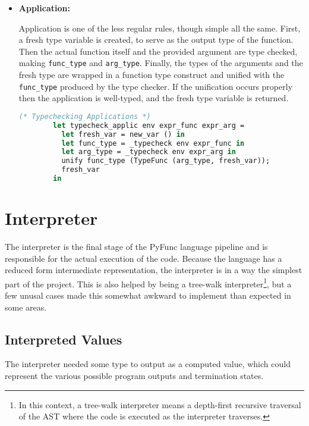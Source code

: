 \documentclass{l4proj}
\begin{document}
\begin{itemize}
    \item \textbf{Application:}
    
    Application is one of the less regular rules, though simple all the same.
    First, a fresh type variable is created, to serve as the output type of the function.
    Then the actual function itself and the provided argument are type checked, making \texttt{func\_type} and \texttt{arg\_type}.
    Finally, the types of the arguments and the fresh type are wrapped in a function type construct and unified with the \texttt{func\_type} produced by the type checker.
    If the unification occurs properly then the application is well-typed, and the fresh type variable is returned.
    \begin{lstlisting}[language=Caml, caption=PyFunc Typechecker's typecheck\_applic function. If no error is produced then the provided application code is well-typed.]
        (* Typechecking Applications *)
        let typecheck_applic env expr_func expr_arg =
          let fresh_var = new_var () in
          let func_type = _typecheck env expr_func in
          let arg_type = _typecheck env expr_arg in
          unify func_type (TypeFunc (arg_type, fresh_var));
          fresh_var
        in
    \end{lstlisting}
\end{itemize}

\section{Interpreter}

The interpreter is the final stage of the PyFunc language pipeline and is responsible for the actual execution of the code.
Because the language has a reduced form intermediate representation, the interpreter is in a way the simplest part of the project.
This is also helped by being a tree-walk interpreter\footnote{In this context, a tree-walk interpreter means a depth-first recursive traversal of the AST where the code is executed as the interpreter traverses.}, but a few unusal cases made this somewhat awkward to implement than expected in some areas.

\subsection{Interpreted Values}

The interpreter needed some type to output as a computed value, which could represent the various possible program outputs and termination states.
\end{document}
